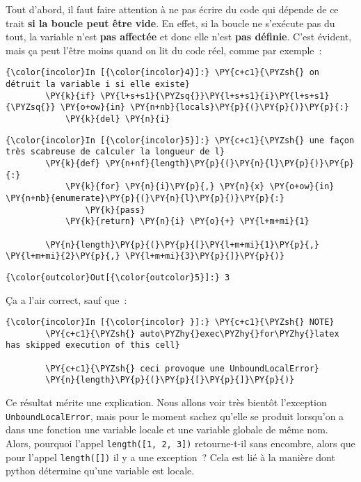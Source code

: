     Tout d'abord, il faut faire attention à ne pas écrire du code qui
dépende de ce trait \textbf{si la boucle peut être vide}. En effet, si
la boucle ne s'exécute pas du tout, la variable n'est \textbf{pas
affectée} et donc elle n'est \textbf{pas définie}. C'est évident, mais
ça peut l'être moins quand on lit du code réel, comme par exemple~:

    \begin{Verbatim}[commandchars=\\\{\}]
{\color{incolor}In [{\color{incolor}4}]:} \PY{c+c1}{\PYZsh{} on détruit la variable i si elle existe}
        \PY{k}{if} \PY{l+s+s1}{\PYZsq{}}\PY{l+s+s1}{i}\PY{l+s+s1}{\PYZsq{}} \PY{o+ow}{in} \PY{n+nb}{locals}\PY{p}{(}\PY{p}{)}\PY{p}{:} 
            \PY{k}{del} \PY{n}{i}   
\end{Verbatim}


    \begin{Verbatim}[commandchars=\\\{\}]
{\color{incolor}In [{\color{incolor}5}]:} \PY{c+c1}{\PYZsh{} une façon très scabreuse de calculer la longueur de l}
        \PY{k}{def} \PY{n+nf}{length}\PY{p}{(}\PY{n}{l}\PY{p}{)}\PY{p}{:}
            \PY{k}{for} \PY{n}{i}\PY{p}{,} \PY{n}{x} \PY{o+ow}{in} \PY{n+nb}{enumerate}\PY{p}{(}\PY{n}{l}\PY{p}{)}\PY{p}{:}
                \PY{k}{pass}
            \PY{k}{return} \PY{n}{i} \PY{o}{+} \PY{l+m+mi}{1}
        
        \PY{n}{length}\PY{p}{(}\PY{p}{[}\PY{l+m+mi}{1}\PY{p}{,} \PY{l+m+mi}{2}\PY{p}{,} \PY{l+m+mi}{3}\PY{p}{]}\PY{p}{)}
\end{Verbatim}


\begin{Verbatim}[commandchars=\\\{\}]
{\color{outcolor}Out[{\color{outcolor}5}]:} 3
\end{Verbatim}
            
    Ça a l'air correct, sauf que~:

    \begin{Verbatim}[commandchars=\\\{\}]
{\color{incolor}In [{\color{incolor} }]:} \PY{c+c1}{\PYZsh{} NOTE}
        \PY{c+c1}{\PYZsh{} auto\PYZhy{}exec\PYZhy{}for\PYZhy{}latex has skipped execution of this cell}
        
        \PY{c+c1}{\PYZsh{} ceci provoque une UnboundLocalError}
        \PY{n}{length}\PY{p}{(}\PY{p}{[}\PY{p}{]}\PY{p}{)}
\end{Verbatim}


    Ce résultat mérite une explication. Nous allons voir très bientôt
l'exception \texttt{UnboundLocalError}, mais pour le moment sachez
qu'elle se produit lorsqu'on a dans une fonction une variable locale et
une variable globale de même nom. Alors, pourquoi l'appel
\texttt{length({[}1,\ 2,\ 3{]})} retourne-t-il sans encombre, alors que
pour l'appel \texttt{length({[}{]})} il y a une exception~? Cela est lié
à la manière dont python détermine qu'une variable est locale.

